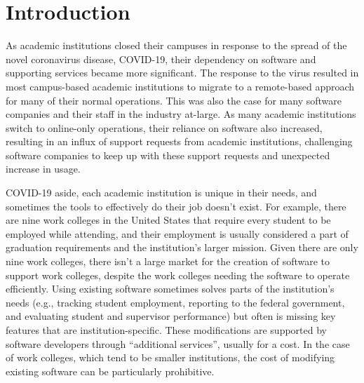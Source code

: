 \section{Introduction}


As academic institutions closed their campuses in response to the spread of the novel coronavirus disease, COVID-19, their dependency on software and supporting services became more significant. The response to the virus resulted in most campus-based academic institutions to migrate to a remote-based approach for many of their normal operations. This was also the case for many software companies and their staff in the industry at-large. As many academic institutions switch to online-only operations, their reliance on software also increased, resulting in an influx of support requests from academic institutions, challenging software companies to keep up with these support requests and unexpected increase in usage.

COVID-19 aside, each academic institution is unique in their needs, and sometimes the tools to effectively do their job doesn't exist. For example, there are nine work colleges in the United States \cite{Ecclesia, WCCMembers} that require every student to be employed while attending, and their employment is usually considered a part of graduation requirements and the institution's larger mission. Given there are only nine work colleges, there isn't a large market for the creation of software to support work colleges, despite the work colleges needing the software to operate efficiently. Using existing software sometimes solves parts of the institution's needs (e.g., tracking student employment, reporting to the federal government, and evaluating student and supervisor performance) but often is missing key features that are institution-specific. These modifications are supported by software developers through ``additional services”, usually for a cost. In the case of work colleges, which tend to be smaller institutions, the cost of modifying existing software can be particularly prohibitive.

